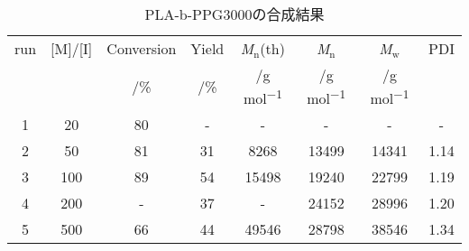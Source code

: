 \begin{table}[t]
    \caption{PLA-b-PPG3000の合成結果}
    \label{table:PLA-b-PPG3000synthesis}
    \centering
    \begin{tabular}{cccccccc}
      \hline
      run &  [M]/[I] & Conversion & Yield & \textit{M}${}_\textrm{n}$(th) & \textit{M}${}_\textrm{n}$ & \textit{M}${}_\textrm{w}$ & PDI\\
      &   & /\% & /\% & /\si{\g} \si{mol^{-1}} & /\si{\g} \si{mol^{-1}} & /\si{\g} \si{mol^{-1}} & \\
      \hline\hline
      1 & 20 & 80 & - & - & - & - & - \\
      2 & 50 & 81 & 31 & 8268 & 13499 & 14341 & 1.14 \\
      3 & 100 & 89 & 54 & 15498 & 19240 & 22799 & 1.19\\
      4 & 200 & - & 37 & - & 24152 & 28996 & 1.20\\
      5 & 500 & 66 & 44 & 49546 & 28798 & 38546 & 1.34\\
      \hline
    \end{tabular}
\end{table}

